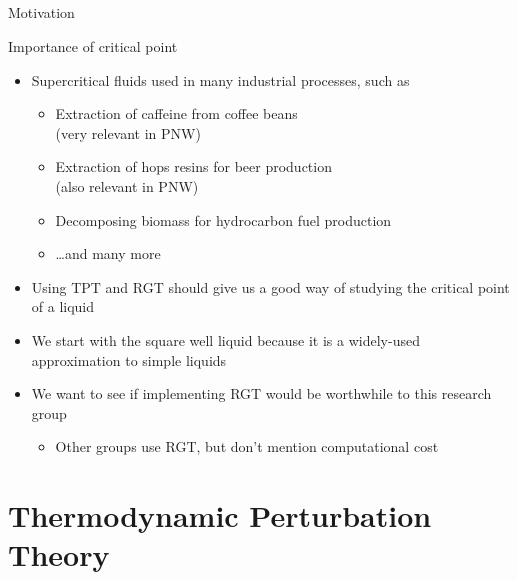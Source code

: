 \documentclass[xcolor=dvipsnames]{beamer}
\begin{document}
\subsection{} %
\begin{frame}{Motivation}
  \begin{block}{Importance of critical point}
  \begin{itemize}
  \item Supercritical fluids used in many industrial processes, such as
    \begin{itemize}
    \item Extraction of caffeine from coffee beans \\ (very relevant in PNW)
    \item Extraction of hops resins for beer production \\ (also relevant in PNW)
    \item Decomposing biomass for hydrocarbon fuel production
    \item \ldots and many more
    \end{itemize}
  \end{itemize}
  \end{block}

  \begin{itemize}
    \item Using TPT and RGT should give us a good way of studying the critical point of a liquid
    \item We start with the square well liquid because it is a widely-used approximation to simple liquids
    \item We want to see if implementing RGT would be worthwhile to this research group
    \begin{itemize}
      \item Other groups use RGT, but don't mention computational cost
    \end{itemize}
  \end{itemize}
\end{frame}

\section[TPT]{Thermodynamic Perturbation Theory}
\subsection{}
\end{document}

